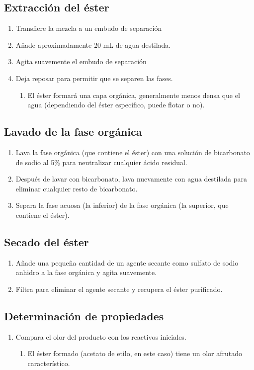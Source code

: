 \subsection{Extracción del éster}
\begin{enumerate}
    \item Transfiere la mezcla a un embudo de separación
    \item Añade aproximadamente 20 mL de agua destilada.
    \item Agita suavemente el embudo de separación
    \item Deja reposar para permitir que se separen las fases.
    \begin{enumerate}
        \item El éster formará una capa orgánica, generalmente menos densa que el agua (dependiendo del éster específico, puede flotar o no).
    \end{enumerate}
\end{enumerate}

\subsection{Lavado de la fase orgánica}
\begin{enumerate}
    \item Lava la fase orgánica (que contiene el éster) con una solución de bicarbonato de sodio al 5\% para neutralizar cualquier ácido residual.
    \item Después de lavar con bicarbonato, lava nuevamente con agua destilada para eliminar cualquier resto de bicarbonato.
    \item Separa la fase acuosa (la inferior) de la fase orgánica (la superior, que contiene el éster).
\end{enumerate}

\subsection{Secado del éster}
\begin{enumerate}
    \item Añade una pequeña cantidad de un agente secante como sulfato de sodio anhidro a la fase orgánica y agita suavemente.
    \item Filtra para eliminar el agente secante y recupera el éster purificado.
\end{enumerate}

\subsection{Determinación de propiedades}
\begin{enumerate}
    \item Compara el olor del producto con los reactivos iniciales.
    \begin{enumerate}
        \item El éster formado (acetato de etilo, en este caso) tiene un olor afrutado característico.
    \end{enumerate}
\end{enumerate}

